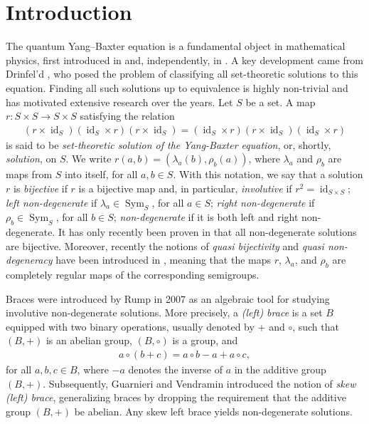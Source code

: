 \documentclass[preprint,1p]{elsarticle}
\theoremstyle{definition}               %
\DeclareMathOperator{\Sym}{Sym}
\DeclareMathOperator{\id}{id}
\begin{document}

\section*{Introduction}
The quantum Yang--Baxter equation is a fundamental object in mathematical physics, first introduced in \cite{Ya67} and, independently, in \cite{Ba72}. A key development came from Drinfel’d \cite{Dr92}, who posed the problem of classifying all set-theoretic solutions to this equation. Finding all such solutions up to equivalence is highly non-trivial and has motivated extensive research over the years. 
Let $S$ be a set. A map $r:S\times S \to S\times S$ satisfying the relation
\begin{align*}
    \left(r \times \id_S\right) 
    \left(\id_S \times r\right)
    \left(r \times \id_S\right) 
    = \left(\id_S \times r\right)
    \left(r \times \id_S\right)
    \left(\id_S \times r\right)
\end{align*}
is said to be \emph{set-theoretic solution of the Yang-Baxter equation}, or, shortly, \emph{solution}, on $S$.  We write $r\left(a, b\right) = \left(\lambda_{a}\left(b\right), \rho_{b}\left(a\right)\right)$, where $\lambda_{a}$ and $\rho_{b}$ are maps from $S$ into itself, for all $a, b\in S$.  
With this notation, we say that a solution $r$ is \textit{bijective} if $r$ is a bijective map and, in particular, \textit{involutive} if $r^2=\id_{S\times S}$; 
\textit{left non-degenerate} if $\lambda_a \in \Sym_S$, for all $a \in S$; 
\textit{right non-degenerate} if $\rho_b \in \Sym_S$, for all $b \in S$; \emph{non-degenerate} if it is both left and right non-degenerate. It has only recently been proven in \cite{JePi25} that all non-degenerate solutions are bijective.
Moreover, recently the notions of \emph{quasi bijectivity} and \emph{quasi non-degeneracy} have been introduced in \cite[Definition 3.1, Definition 3.3]{MaSteWi26x}, meaning that the maps $r$, $\lambda_a$, and $\rho_b$ are completely regular maps of the corresponding semigroups.


Braces were introduced by Rump in 2007 \cite{Ru07} as an algebraic tool for studying involutive non-degenerate solutions. More precisely, a \emph{(left) brace} is a set $B$ equipped with two binary operations, usually denoted by $+$ and $\circ$, such that $(B, +)$ is an abelian group, $(B, \circ)$ is a group, and
\begin{align*}
    a \circ (b+c)=a \circ b-a+a\circ c,
\end{align*}
for all $a, b, c \in B$, where $-a$ denotes the inverse of $a$ in the additive group $(B, +)$. Subsequently, Guarnieri and Vendramin \cite{GuVe17} introduced the notion of \emph{skew (left) brace}, generalizing braces by dropping the requirement that the additive group $(B,+)$ be abelian. Any skew left brace yields non-degenerate solutions.
\end{document}
